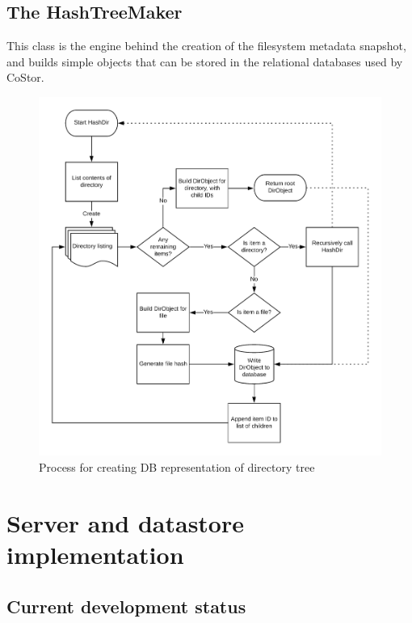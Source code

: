 \documentclass[bsc,frontabs,twoside,singlespacing,parskip,deptreport]{infthesis}     %
\begin{document}
\section{The HashTreeMaker}

This class is the engine behind the creation of the filesystem metadata snapshot, and builds
simple objects that can be stored in the relational databases used by CoStor.

\begin{figure}[h]
	\includegraphics[width=\linewidth]{img/hasherflow.png}
	\caption{Process for creating DB representation of directory tree}
	\label{fig:hasherflow}
\end{figure}


\chapter{Server and datastore implementation}

\section{Current development status}
\end{document}
